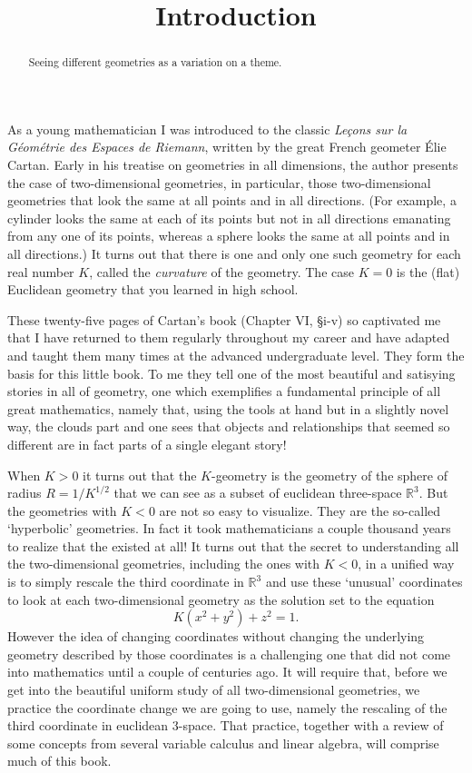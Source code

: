 \documentclass{ximera}
\title{Introduction}
\begin{document}
\begin{abstract}
Seeing different geometries as a variation on a theme.
\end{abstract}
\maketitle

As a young mathematician I was introduced to the classic \textit{Le\c{c}ons
sur la G\'{e}om\'{e}trie des Espaces de Riemann}, written by the great French
geometer \'{E}lie Cartan. Early in his treatise on geometries in all
dimensions, the author presents the case of two-dimensional geometries, in
particular, those two-dimensional geometries that look the same at all points
and in all directions. (For example, a cylinder looks the same at each of its
points but not in all directions emanating from any one of its points, whereas
a sphere looks the same at all points and in all directions.) It turns out
that there is one and only one such geometry for each real number $K$, called
the \textit{curvature} of the geometry. The case $K=0$ is the (flat) Euclidean
geometry that you learned in high school.

These twenty-five pages of Cartan's book (Chapter VI, \S i-v) so captivated me
that I have returned to them regularly throughout my career and have adapted
and taught them many times at the advanced undergraduate level. They form the
basis for this little book. To me they tell one of the most beautiful and
satisying stories in all of geometry, one which exemplifies a fundamental
principle of all great mathematics, namely that, using the tools at hand but
in a slightly novel way, the clouds part and one sees that objects and
relationships that seemed so different are in fact parts of a single elegant story!

When $K>0$ it turns out that the $K$-geometry is the geometry of the sphere of
radius $R=1/K^{1/2}$ that we can see as a subset of euclidean three-space
$\mathbb{R}^{3}$. But the geometries with $K<0$ are not so easy to
visualize. They are the so-called `hyperbolic' geometries. In fact it took
mathematicians a couple thousand years to realize that the existed at all! It
turns out that the secret to understanding all the two-dimensional geometries,
including the ones with $K<0$, in a unified way is to simply rescale the third
coordinate in $\mathbb{R}^{3}$ and use these `unusual' coordinates to look at each two-dimensional geometry as the solution set
to the equation%
\[
K\left(  x^{2}+y^{2}\right)  +z^{2}=1.
\]
However the idea of changing coordinates without changing the underlying
geometry described by those coordinates is a challenging one that did not come
into mathematics until a couple of centuries ago. It will require that, before
we get into the beautiful uniform study of all two-dimensional geometries, we
practice the coordinate change we are going to use, namely the rescaling of
the third coordinate in euclidean $3$-space. That practice, together with a
review of some concepts from several variable calculus and linear algebra,
will comprise much of this book.
\end{document}
